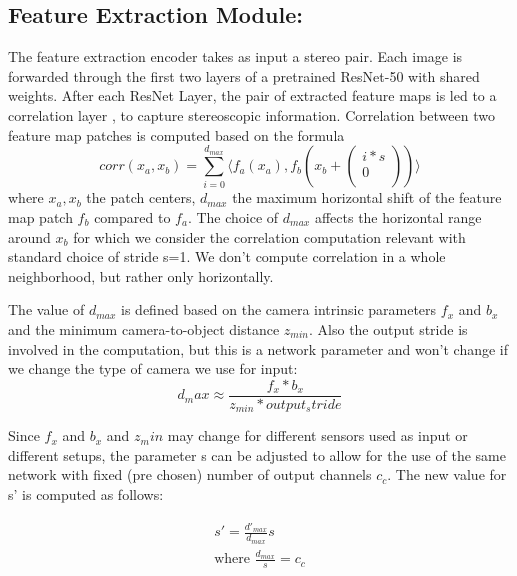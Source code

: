\subsection{Feature Extraction Module:}
The feature extraction encoder takes as input a stereo pair. Each image is forwarded through the first two layers of a pretrained ResNet-50 \cite{resnet}with shared weights. After each ResNet Layer, the pair of extracted feature maps is led to a correlation layer \cite{segstereo}, \cite{flownet} to capture stereoscopic information.  Correlation between two feature map patches is computed based on the formula 
\begin{equation}
    corr(x_a, x_b) = \sum_{i=0}^{d_{max}} \langle {f_a(x_a),f_b(x_b + \begin{pmatrix}
         i * s \\
           0 \\
        \end{pmatrix} )} \rangle
\end{equation}
where $x_a, x_b$ the patch centers, $d_{max}$ the maximum horizontal shift of the feature map patch $f_b$ compared to $f_a$. The choice of $d_{max}$ affects the  horizontal range around $x_b$ for which we consider the correlation computation relevant with standard choice of stride s=1. We don't compute correlation in a whole neighborhood, but rather only horizontally. \par %

The value of $d_{max}$ is defined based on the camera intrinsic parameters $f_x$ and $b_x$ and the minimum camera-to-object distance $z_{min}$. Also the output stride is involved in the computation, but this is a network parameter and won't change if we change the type of camera we use for input:
\begin{equation}
    d_max \approx \frac{f_x * b_x}{z_{min} * output_stride}
\end{equation}

Since $f_x$ and $b_x$ and $z_min$ may change for different sensors used as input or different setups, the parameter s can be adjusted to allow for the use of the same network with fixed (pre chosen) number of output channels $c_c$. The new value for s' is computed as follows:

\begin{gather}
    s' = \frac{d'_{max}}{d_{max}}s \\
    \text{where } \frac{d_{max}}{s} = c_c
\end{gather}


